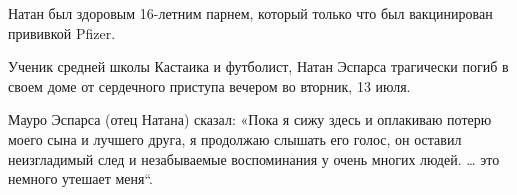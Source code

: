 Натан был здоровым 16-летним парнем, который только что был вакцинирован
прививкой Pfizer.

Ученик средней школы Кастаика и футболист, Натан Эспарса трагически погиб в
своем доме от сердечного приступа вечером во вторник, 13 июля.

Мауро Эспарса (отец Натана) сказал: «Пока я сижу здесь и оплакиваю потерю моего
сына и лучшего друга, я продолжаю слышать его голос, он оставил неизгладимый
след и незабываемые воспоминания у очень многих людей. … это немного утешает
меня“.
